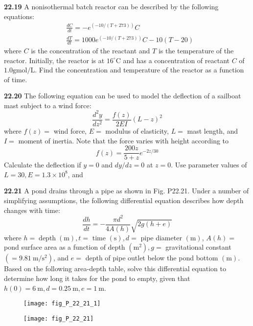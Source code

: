 \documentclass[../main.tex]{subfiles}
\begin{document}
\begin{multicols}{2}
    \noindent\textbf{22.19} A nonisothermal batch reactor can be described by the following equations:
    $$
    \begin{aligned}
    &\frac{d C}{d t}=-e^{(-10 /(T+273))} C \\
    &\frac{d T}{d t}=1000 e^{(-10 /(T+273))} C-10(T-20)
    \end{aligned}
    $$
    where $C$ is the concentration of the reactant and $T$ is the temperature of the reactor. Initially, the reactor is at $16^{\circ} \mathrm{C}$ and has a concentration of reactant $C$ of $1.0 \mathrm{gmol} / \mathrm{L}$. Find the concentration and temperature of the reactor as a function of time.\vspace{2mm}

    \noindent\textbf{22.20} The following equation can be used to model the deflection of a sailboat mast subject to a wind force:
    $$
    \frac{d^{2} y}{d z^{2}}=\frac{f(z)}{2 E I}(L-z)^{2}
    $$
    where $f(z)=$ wind force, $E=$ modulus of elasticity, $L=$ mast length, and $I=$ moment of inertia. Note that the force varies with height according to
    $$
    f(z)=\frac{200 z}{5+z} e^{-2 z / 30}
    $$
    Calculate the deflection if $y=0$ and $d y / d z=0$ at $z=0$. Use parameter values of $L=30, E=1.3 \times 10^{8}$, and\vspace{2mm}

    \noindent\textbf{22.21} A pond drains through a pipe as shown in Fig. P22.21. Under a number of simplifying assumptions, the following differential equation describes how depth changes with time:$$\frac{d h}{d t}=-\frac{\pi d^{2}}{4 A(h)} \sqrt{2 g(h+e)}$$
    where $h=\operatorname{depth}(\mathrm{m}), t=$ time $(\mathrm{s}), d=$ pipe diameter $(\mathrm{m})$, $A(h)=$ pond surface area as a function of depth $\left(\mathrm{m}^{2}\right), g=$ gravitational constant $\left(=9.81 \mathrm{~m} / \mathrm{s}^{2}\right)$, 
    and $e=$ depth of pipe outlet below the pond bottom $(\mathrm{m})$. Based on the following area-depth table, solve this differential equation to determine how long it takes for the pond to empty, given that $h(0)=6 \mathrm{~m}, d=0.25 \mathrm{~m}, e=1 \mathrm{~m}$.

    \begin{figure}[H]
        \centering
        \texttt{[image: fig\_P\_22\_21\_1]}
        \label{fig:fig_P_22_21_1}
    \end{figure}
    
    \begin{figure}[H]
        \centering
        \texttt{[image: fig\_P\_22\_21]}
        \caption{\textsf{}}
        \label{fig:fig_P_22_21}
    \end{figure}\vspace{2mm}


\end{multicols}
\end{document}
